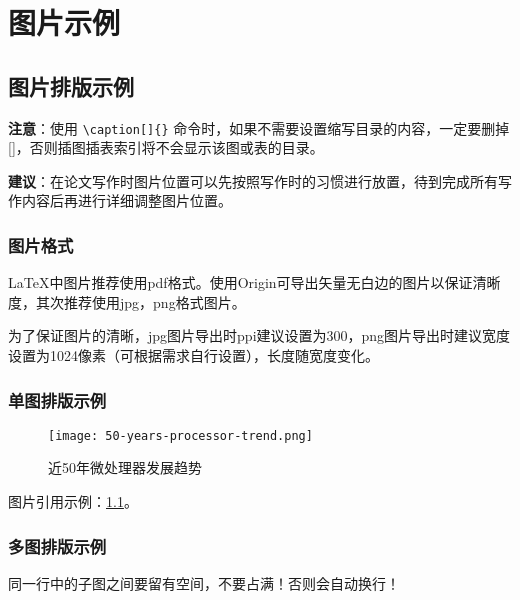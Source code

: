 \chapter{图片示例}\label{ch:2}

\section{图片排版示例}
\textbf{注意}：使用 \verb|\caption[]{}| 命令时，如果不需要设置缩写目录的内容，一定要删掉[]，否则插图插表索引将不会显示该图或表的目录。

\textbf{建议}：在论文写作时图片位置可以先按照写作时的习惯进行放置，待到完成所有写作内容后再进行详细调整图片位置。

\subsection{图片格式}

\LaTeX 中图片推荐使用pdf格式。使用Origin可导出矢量无白边的图片以保证清晰度，其次推荐使用jpg，png格式图片。

为了保证图片的清晰，jpg图片导出时ppi建议设置为300，png图片导出时建议宽度设置为1024像素（可根据需求自行设置），长度随宽度变化。

\subsection{单图排版示例}

\begin{figure}[htb]
    \texttt{[image: 50-years-processor-trend.png]}
    \caption[处理器发展]{近50年微处理器发展趋势} %
    \label{fig:processor-trend}
\end{figure}

图片引用示例：\cref{fig:processor-trend}。

\subsection{多图排版示例}
同一行中的子图之间要留有空间，不要占满！否则会自动换行！

